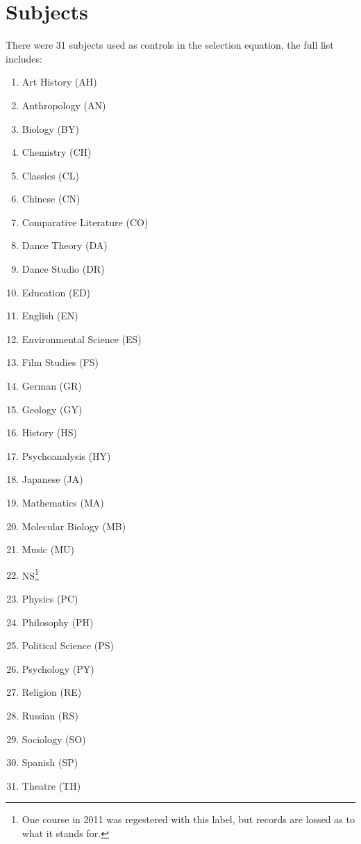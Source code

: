 \section{Subjects}\label{appendix:a}

There were 31 subjects used as controls in the selection equation, the full list includes:
\begin{multicols}{2}
  \begin{enumerate}
    \itemsep0em
  \item{Art History (AH)} 
  \item{Anthropology (AN)}
  \item{Biology (BY)}
  \item{Chemistry (CH)}
  \item{Classics (CL)}
  \item{Chinese (CN)}
  \item{Comparative Literature (CO)}
  \item{Dance Theory (DA)}
  \item{Dance Studio (DR)}
  \item{Education (ED)}
  \item{English (EN)}
  \item{Environmental Science (ES)}
  \item{Film Studies (FS)}
  \item{German (GR)}
  \item{Geology (GY)}
  \item{History (HS)}
  \item{Psychoanalysis (HY)}
  \item{Japanese (JA)}
  \item{Mathematics (MA)}
  \item{Molecular Biology (MB)}
  \item{Music (MU)}
  \item{NS\footnote{One course in 2011 was regestered with this label, but records are lossed as to what it stands for.}}
  \item{Physics (PC)}
  \item{Philosophy (PH)}
  \item{Political Science (PS)}
  \item{Psychology (PY)}
  \item{Religion (RE)}
  \item{Russian (RS)}
  \item{Sociology (SO)}
  \item{Spanish (SP)}
  \item{Theatre (TH)}
  \end{enumerate}
\end{multicols}

